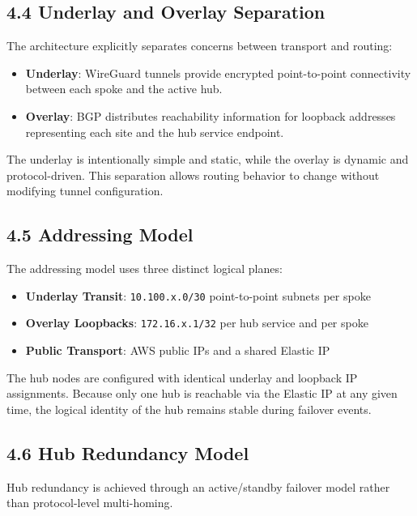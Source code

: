 \documentclass[11pt]{article}
\begin{document}
\subsection{4.4 Underlay and Overlay Separation}
\label{sec:underlay-overlay}

The architecture explicitly separates concerns between transport and routing:

\begin{itemize}
  \item \textbf{Underlay}: WireGuard tunnels provide encrypted point-to-point connectivity between each spoke and the active hub.
  \item \textbf{Overlay}: BGP distributes reachability information for loopback addresses representing each site and the hub service endpoint.
\end{itemize}

The underlay is intentionally simple and static, while the overlay is dynamic and protocol-driven. This separation allows routing behavior to change without modifying tunnel configuration.

\subsection{4.5 Addressing Model}
\label{sec:addressing-model}

The addressing model uses three distinct logical planes:

\begin{itemize}
  \item \textbf{Underlay Transit}: \texttt{10.100.x.0/30} point-to-point subnets per spoke
  \item \textbf{Overlay Loopbacks}: \texttt{172.16.x.1/32} per hub service and per spoke
  \item \textbf{Public Transport}: AWS public IPs and a shared Elastic IP
\end{itemize}

The hub nodes are configured with identical underlay and loopback IP assignments. Because only one hub is reachable via the Elastic IP at any given time, the logical identity of the hub remains stable during failover events.

\subsection{4.6 Hub Redundancy Model}
\label{sec:hub-redundancy}

Hub redundancy is achieved through an active/standby failover model rather than protocol-level multi-homing.
\end{document}
